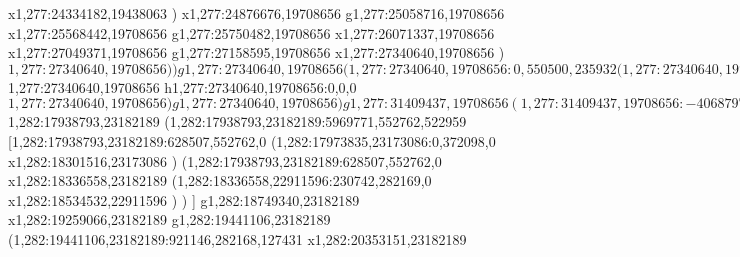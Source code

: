 {x1,277:24334182,19438063
)
x1,277:24876676,19708656
g1,277:25058716,19708656
x1,277:25568442,19708656
g1,277:25750482,19708656
x1,277:26071337,19708656
x1,277:27049371,19708656
g1,277:27158595,19708656
x1,277:27340640,19708656
)
$1,277:27340640,19708656
)
)
g1,277:27340640,19708656
(1,277:27340640,19708656:0,550500,235932
(1,277:27340640,19708656:0,0,0
$1,277:27340640,19708656
h1,277:27340640,19708656:0,0,0
$1,277:27340640,19708656
)
g1,277:27340640,19708656
)
g1,277:31409437,19708656
(1,277:31409437,19708656:-4068797,550500,235932
)
g1,277:27340640,19708656
)
(1,280:10437920,21162432:20971518,455111,127431
(1,279:10437920,21162432:0,291271,0
g1,279:10437920,21162432
g1,279:9127198,21162432
g1,279:8799518,21162432
(1,279:8799518,21162432:1310722,291271,0
k1,279:10110240,21162432:1310722
(1,279:10110240,21162432:0,291271,0
k1,279:9782559,21162432:-327681
x1,279:10110240,21162432
)
)
g1,279:10437920,21162432
)
x1,279:11566597,21162432
k1,279:11893868,21162432:327271
x1,279:12321674,21162432
x1,279:13561400,21162432
k1,279:13888671,21162432:327271
x1,279:14562237,21162432
x1,279:15508870,21162432
k1,279:15836140,21162432:327270
x1,279:18605044,21162432
k1,279:18932315,21162432:327271
x1,279:21775855,21162432
k1,279:22103126,21162432:327271
x1,279:23013350,21162432
k1,279:23340621,21162432:327271
x1,279:26874112,21162432
k1,279:27201382,21162432:327270
x1,279:27783926,21162432
k1,279:28111197,21162432:327271
x1,279:29021421,21162432
k1,279:29348692,21162432:327271
x1,279:31172780,21162432
x1,279:31409438,21162432
k1,279:31409438,21162432:0
)
(1,280:10437920,21948864:20971518,455111,0
x1,280:12296597,21948864
g1,279:12515050,21948864
x1,279:13570911,21948864
g1,279:13789364,21948864
x1,279:15140137,21948864
k1,280:31409438,21948864:16269301
g1,280:31409438,21948864
)
(1,282:10437920,23182189:13470644,552762,522959
g1,282:17938793,23182189
(1,282:17938793,23182189:5969771,552762,522959
g1,282:17938793,23182189
(1,282:17938793,23182189:0,550500,235932
[1,282:17938793,23182189:0,550500,235932
(1,21:17938793,23182189:0,550500,235932
r1,282:17938793,23182189:0,786432,235932
)
]
)
(1,282:17938793,23182189:5969771,552762,522959
$1,282:17938793,23182189
(1,282:17938793,23182189:5969771,552762,522959
[1,282:17938793,23182189:628507,552762,0
(1,282:17973835,23173086:0,372098,0
x1,282:18301516,23173086
)
(1,282:17938793,23182189:628507,552762,0
x1,282:18336558,23182189
(1,282:18336558,22911596:230742,282169,0
x1,282:18534532,22911596
)
)
]
g1,282:18749340,23182189
x1,282:19259066,23182189
g1,282:19441106,23182189
(1,282:19441106,23182189:921146,282168,127431
x1,282:20353151,23182189
}
